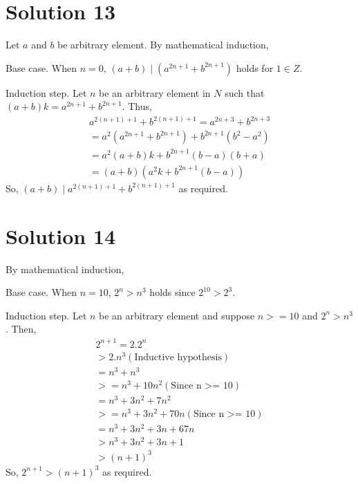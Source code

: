 \documentclass{article}
\begin{document}
\section{Solution 13}
Let $a$ and $b$ be arbitrary element. By mathematical induction,

Base case. When $n=0$, $(a+b) \mid (a^{2n+1} + b^{2n + 1})$ holds for
$1 \in Z$.

Induction step. Let $n$ be an arbitrary element in $N$ such that
$(a+b)k = a^{2n+1} + b^{2n+1}$. Thus,
\begin{align*}
  a^{2(n+1) + 1} + b^{2(n+1) + 1} = a^{2n + 3} + b^{2n + 3} \\
  = a^2(a^{2n + 1}+ b^{2n+1}) + b^{2n+1}(b^2 - a^2) \\
  = a^2(a+b)k + b^{2n+1}(b-a)(b+a) \\
  = (a+b)(a^2k + b^{2n+1}(b-a))
\end{align*}
So, $(a+b) \mid a^{2(n+1) + 1} + b^{2(n+1) + 1}$ as required.

\section{Solution 14}
By mathematical induction,

Base case. When $n = 10$, $2^n > n^3$ holds since $2^{10} > 2^3$.

Induction step. Let $n$ be an arbitrary element and suppose $n >= 10$
and $2^n > n^3$. Then,
\begin{align*}
  2^{n+1} = 2.2^n \\
  > 2.n^3 (\text{Inductive hypothesis}) \\
  = n^3 + n^3 \\
  >= n^3 + 10n^2 (\text{Since n >= 10}) \\
  = n^3 + 3n^2 + 7n^2 \\
  >= n^3 + 3n^2 + 70n (\text{Since n >= 10}) \\
  = n^3 + 3n^2 + 3n + 67n \\
  > n^3 + 3n^2 + 3n + 1 \\
  > (n+1)^3
\end{align*}
So, $2^{n+1} > (n+1)^3$ as required.
\end{document}
